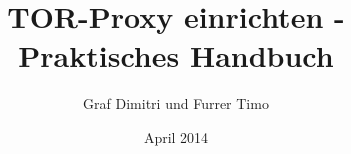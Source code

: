 \documentclass[12pt,titlepage]{article}
\begin{document}
\title{TOR-Proxy einrichten - Praktisches Handbuch}
\author{Graf Dimitri und Furrer Timo}
\date{April 2014}
\maketitle

\tableofcontents
\newpage


\end{document}
